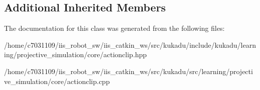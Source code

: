 \subsection*{Additional Inherited Members}


The documentation for this class was generated from the following files\-:\begin{DoxyCompactItemize}
\item 
/home/c7031109/iis\-\_\-robot\-\_\-sw/iis\-\_\-catkin\-\_\-ws/src/kukadu/include/kukadu/learning/projective\-\_\-simulation/core/actionclip.\-hpp\item 
/home/c7031109/iis\-\_\-robot\-\_\-sw/iis\-\_\-catkin\-\_\-ws/src/kukadu/src/learning/projective\-\_\-simulation/core/actionclip.\-cpp\end{DoxyCompactItemize}
